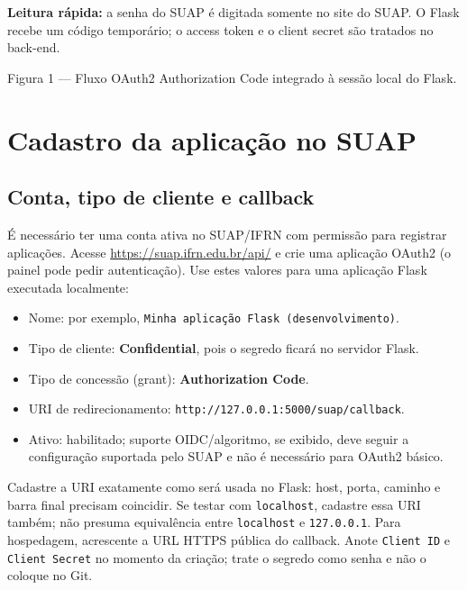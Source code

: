 \documentclass[11pt,a4paper]{article}
\begin{document}
\begin{center}\colorbox{azulclaro}{\parbox{.9\linewidth}{\textbf{Leitura rápida:} a senha do SUAP é digitada somente no site do SUAP. O Flask recebe um código temporário; o access token e o client secret são tratados no back-end.}}\end{center}
\begin{center}\small Figura 1 — Fluxo OAuth2 Authorization Code integrado à sessão local do Flask.\end{center}

\clearpage
\section{Cadastro da aplicação no SUAP}
\subsection{Conta, tipo de cliente e callback}
É necessário ter uma conta ativa no SUAP/IFRN com permissão para registrar aplicações. Acesse \url{https://suap.ifrn.edu.br/api/} e crie uma aplicação OAuth2 (o painel pode pedir autenticação). Use estes valores para uma aplicação Flask executada localmente:
\begin{itemize}[nosep]
\item Nome: por exemplo, \texttt{Minha aplicação Flask (desenvolvimento)}.
\item Tipo de cliente: \textbf{Confidential}, pois o segredo ficará no servidor Flask.
\item Tipo de concessão (grant): \textbf{Authorization Code}.
\item URI de redirecionamento: \texttt{http://127.0.0.1:5000/suap/callback}.
\item Ativo: habilitado; suporte OIDC/algoritmo, se exibido, deve seguir a configuração suportada pelo SUAP e não é necessário para OAuth2 básico.
\end{itemize}
Cadastre a URI exatamente como será usada no Flask: host, porta, caminho e barra final precisam coincidir. Se testar com \texttt{localhost}, cadastre essa URI também; não presuma equivalência entre \texttt{localhost} e \texttt{127.0.0.1}. Para hospedagem, acrescente a URL HTTPS pública do callback. Anote \texttt{Client ID} e \texttt{Client Secret} no momento da criação; trate o segredo como senha e não o coloque no Git.
\end{document}
